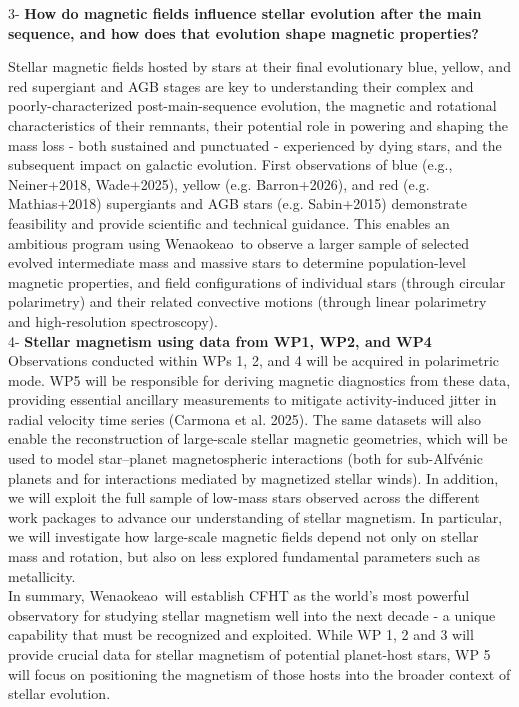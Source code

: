 \documentclass[
    traditabstract,
    longauth,
    onecolumn,
]{aa}
\def \wena{Wenaokeao}
\begin{document}
3- {\bf How do magnetic fields influence stellar evolution after the main sequence, and how does that evolution shape magnetic properties?}

Stellar magnetic fields hosted by stars at their final evolutionary blue, yellow, and red supergiant and AGB stages are key to understanding their complex and poorly-characterized post-main-sequence evolution, the magnetic and rotational characteristics of their remnants, their potential role in powering and shaping the mass loss - both sustained and punctuated - experienced by dying stars, and the subsequent impact on galactic evolution. First observations of blue (e.g., Neiner+2018, Wade+2025), yellow (e.g. Barron+2026), and red (e.g. Mathias+2018) supergiants and AGB stars (e.g. Sabin+2015) demonstrate feasibility and provide scientific and technical guidance. This enables an ambitious program using \wena\ to observe a larger sample of selected evolved intermediate mass and massive stars to determine population-level magnetic properties, and field configurations of individual stars (through circular polarimetry) and their related convective motions (through linear polarimetry and high-resolution spectroscopy).\\

4- {\bf Stellar magnetism using data from WP1, WP2, and WP4}\\

Observations conducted within WPs 1, 2, and 4 will be acquired in polarimetric mode. WP5 will be responsible for deriving magnetic diagnostics from these data, providing essential ancillary measurements to mitigate activity-induced jitter in radial velocity time series (Carmona et al. 2025). The same datasets will also enable the reconstruction of large-scale stellar magnetic geometries, which will be used to model star–planet magnetospheric interactions (both for sub-Alfvénic planets and for interactions mediated by magnetized stellar winds). In addition, we will exploit the full sample of low-mass stars observed across the different work packages to advance our understanding of stellar magnetism. In particular, we will investigate how large-scale magnetic fields depend not only on stellar mass and rotation, but also on less explored fundamental parameters such as metallicity.\\   

In summary, \wena\ will establish CFHT as the world’s most powerful observatory for studying stellar magnetism well into the next decade - a unique capability that must be recognized and exploited. While WP 1, 2 and 3 will provide crucial data for stellar magnetism of potential planet-host stars, WP 5 will focus on positioning the magnetism of those hosts into the broader context of stellar evolution. 
\end{document}
